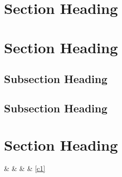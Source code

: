 \section{Section Heading}
\section{Section Heading}
\subsection{Subsection Heading}
\subsection{Subsection Heading}
\section{Section Heading}



 \&  \&   \& \pageref{c1} \& \ref{c1} 




